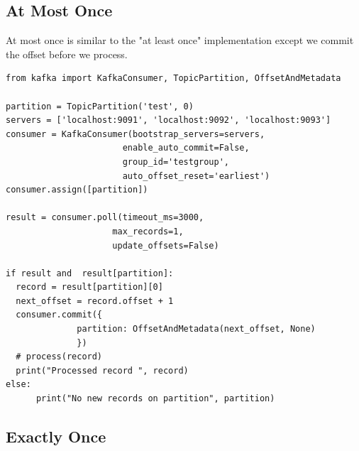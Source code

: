 \documentclass[11pt]{article}
\begin{document}
\clearpage
\subsection{At Most Once}
At most once is similar to the "at least once" implementation except we commit the offset before we process.
\newline
\begin{adjustwidth}{-30pt}{0pt}
\begin{Verbatim}
from kafka import KafkaConsumer, TopicPartition, OffsetAndMetadata

partition = TopicPartition('test', 0)
servers = ['localhost:9091', 'localhost:9092', 'localhost:9093']
consumer = KafkaConsumer(bootstrap_servers=servers,
                       enable_auto_commit=False,
                       group_id='testgroup',
                       auto_offset_reset='earliest')
consumer.assign([partition])

result = consumer.poll(timeout_ms=3000,
                     max_records=1,
                     update_offsets=False)

if result and  result[partition]:
  record = result[partition][0]
  next_offset = record.offset + 1
  consumer.commit({
              partition: OffsetAndMetadata(next_offset, None)
              })
  # process(record)
  print("Processed record ", record)
else:
      print("No new records on partition", partition)

\end{Verbatim}
\end{adjustwidth}
\clearpage
\subsection{Exactly Once}
\end{document}
